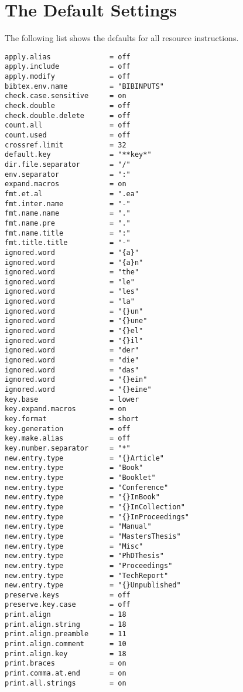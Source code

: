 \documentclass[11pt,a4paper]{scrbook}
\begin{document}
\section{The Default Settings}

The following list shows the defaults for all resource instructions.

\begin{lstlisting}[language=BibTool]
apply.alias              = off
apply.include            = off
apply.modify             = off
bibtex.env.name          = "BIBINPUTS"
check.case.sensitive     = on
check.double             = off
check.double.delete      = off
count.all                = off
count.used               = off
crossref.limit           = 32
default.key              = "**key*"
dir.file.separator       = "/"
env.separator            = ":"
expand.macros            = on
fmt.et.al                = ".ea"
fmt.inter.name           = "-"
fmt.name.name            = "."
fmt.name.pre             = "."
fmt.name.title           = ":"
fmt.title.title          = "-"
ignored.word             = "{a}"
ignored.word             = "{a}n"
ignored.word             = "the"
ignored.word             = "le"
ignored.word             = "les"
ignored.word             = "la"
ignored.word             = "{}un"
ignored.word             = "{}une"
ignored.word             = "{}el"
ignored.word             = "{}il"
ignored.word             = "der"
ignored.word             = "die"
ignored.word             = "das"
ignored.word             = "{}ein"
ignored.word             = "{}eine"
key.base                 = lower
key.expand.macros        = on
key.format               = short
key.generation           = off
key.make.alias           = off
key.number.separator     = "*"
new.entry.type           = "{}Article"    
new.entry.type           = "Book" 
new.entry.type           = "Booklet"
new.entry.type           = "Conference"
new.entry.type           = "{}InBook"     
new.entry.type           = "{}InCollection"
new.entry.type           = "{}InProceedings"
new.entry.type           = "Manual"       
new.entry.type           = "MastersThesis"
new.entry.type           = "Misc" 
new.entry.type           = "PhDThesis"
new.entry.type           = "Proceedings"
new.entry.type           = "TechReport"
new.entry.type           = "{}Unpublished"
preserve.keys            = off
preserve.key.case        = off
print.align              = 18
print.align.string       = 18
print.align.preamble     = 11
print.align.comment      = 10
print.align.key          = 18
print.braces             = on
print.comma.at.end       = on
print.all.strings        = on

\end{lstlisting}
\end{document}
